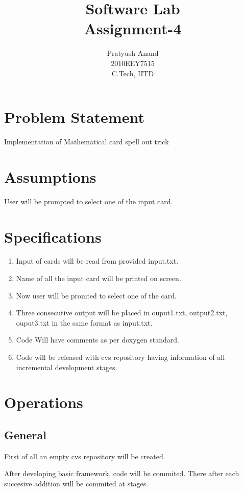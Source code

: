 \documentclass[a4paper,10pt]{report} %
\title{Software Lab \\Assignment-4}
\author{Pratyush Anand \\2010EEY7515 \\C.Tech, IITD}
\begin{document}
  \maketitle

  \chapter{Problem Statement}
    Implementation of Mathematical card spell out trick

\chapter{Assumptions}
  User will be prompted to select one of the input card.

\chapter{Specifications}
\begin{enumerate}
 \item Input of cards will be read from provided input.txt.
 \item Name of all the input card will be printed on screen.
 \item Now user will be promted to select one of the card.
 \item Three consecutive output will be placed in ouput1.txt, output2.txt, ouput3.txt in the same format as input.txt.
 \item Code Will have comments as per doxygen standard.
 \item Code will be released with cvs repository having information of all incremental development stages.
\end{enumerate}

\chapter{Operations}
\section{General}
\begin{description}
  \item First of all an empty cvs repository will be created.
  \item After developing basic framework, code will be commited. There after each succesive addition will be commited at stages.
 \end{description}
\end{document}
